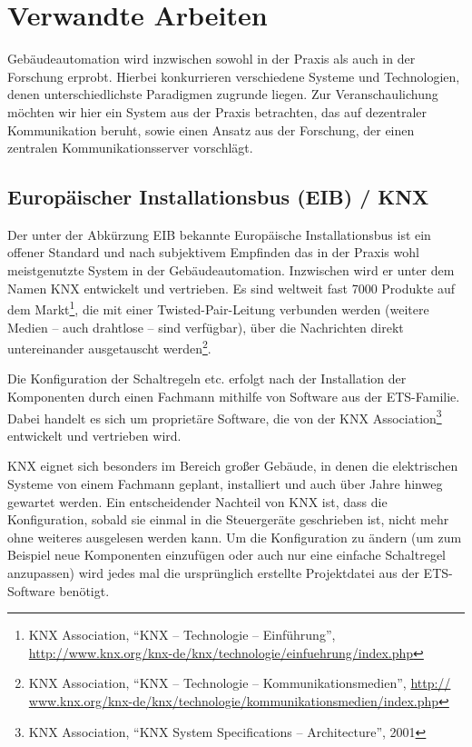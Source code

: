 \documentclass{IEEEtran}
\begin{document}
\section{Verwandte Arbeiten}
    Gebäudeautomation wird inzwischen sowohl in der Praxis
    als auch in der Forschung erprobt. Hierbei konkurrieren verschiedene Systeme
    und Technologien, denen unterschiedlichste Paradigmen zugrunde liegen.
    Zur Veranschaulichung möchten wir hier ein System aus der Praxis betrachten,
    das auf dezentraler Kommunikation beruht,
    sowie einen Ansatz aus der Forschung,
    der einen zentralen Kommunikationsserver vorschlägt.

    \subsection{Europäischer Installationsbus (EIB) / KNX}
    Der unter der Abkürzung EIB bekannte Europäische Installationsbus
    ist ein offener Standard und nach subjektivem Empfinden das in der Praxis
    wohl meistgenutzte System in der Gebäudeautomation.
    Inzwischen wird er unter dem Namen KNX entwickelt und vertrieben.
    Es sind weltweit fast 7000 Produkte auf dem Markt\footnote{ KNX Association, \enquote{KNX -- Technologie -- Einführung}, \url{http://www.knx.org/knx-de/knx/technologie/einfuehrung/index.php}},
    die mit einer Twisted-Pair-Leitung verbunden werden
    (weitere Medien -- auch drahtlose -- sind verfügbar),
    über die Nachrichten direkt untereinander ausgetauscht werden\footnote{KNX Association, \enquote{KNX -- Technologie -- Kommunikationsmedien}, \url{http://
www.knx.org/knx-de/knx/technologie/kommunikationsmedien/index.php}}.

    Die Konfiguration der Schaltregeln etc. erfolgt nach der Installation
    der Komponenten durch einen Fachmann mithilfe von Software aus der
    ETS-Familie. Dabei handelt es sich um proprietäre Software,
    die von der KNX Association\footnote{KNX Association, \enquote{KNX System Specifications -- Architecture}, 2001}
    entwickelt und vertrieben wird.
    

    KNX eignet sich besonders im Bereich großer Gebäude, in denen die
    elektrischen Systeme von einem Fachmann geplant, installiert und auch über
    Jahre hinweg gewartet werden. Ein entscheidender Nachteil von KNX ist,
    dass die Konfiguration, sobald sie einmal in die Steuergeräte geschrieben
    ist, nicht mehr ohne weiteres ausgelesen werden kann.
    Um die Konfiguration zu ändern (um zum Beispiel neue Komponenten einzufügen
    oder auch nur eine einfache Schaltregel anzupassen) wird jedes mal
    die ursprünglich erstellte Projektdatei aus der ETS-Software benötigt.
\end{document}
